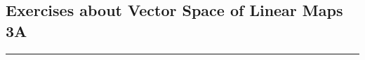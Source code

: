 \subsection*{Exercises about Vector Space of Linear Maps 3A}
\hrule
\phantom{.}

\setcounter{xrcscount}{11}
%
%

